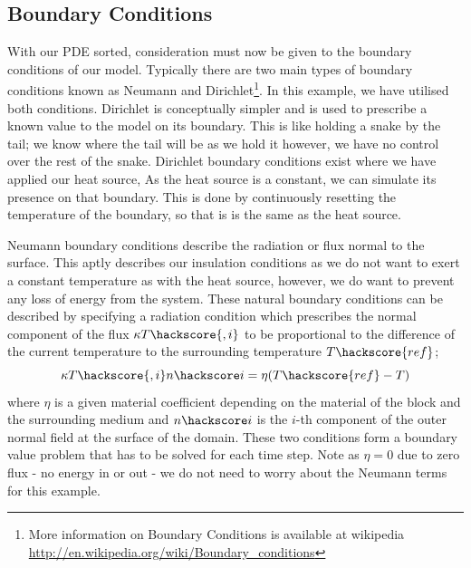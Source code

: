 \subsection{Boundary Conditions}
With our PDE sorted, consideration must now be given to the boundary conditions of our model. Typically there are two main types of boundary conditions known as Neumann and Dirichlet\footnote{More information on Boundary Conditions is available at wikipedia \url{http://en.wikipedia.org/wiki/Boundary_conditions}}. In this example, we have utilised both conditions. Dirichlet is conceptually simpler and is used to prescribe a known value to the model on its boundary. This is like holding a snake by the tail; we know where the tail will be as we hold it however, we have no control over the rest of the snake. Dirichlet boundary conditions exist where we have applied our heat source, As the heat source is a constant, we can simulate its presence on that boundary. This is done by continuously resetting the temperature of the boundary, so that is is the same as the heat source.  

Neumann boundary conditions describe the radiation or flux normal to the surface. This aptly describes our insulation conditions as we do not want to exert a constant temperature as with the heat source, however, we do want to prevent any loss of energy from the system. These natural boundary conditions can be described by specifying a radiation condition which prescribes the normal component of the flux $\kappa T\hackscore{,i}$ to be proportional
to the difference of the current temperature to the surrounding temperature $T\hackscore{ref}$;
\begin{equation}
 \kappa T\hackscore{,i} n\hackscore i = \eta (T\hackscore{ref}-T) 
\label{eqn:hdbc}
\end{equation}
where $\eta$ is a given material coefficient depending on the material of the block and the surrounding medium and $n\hackscore i$ is the $i$-th component of the outer normal field  at the surface of the domain. These two conditions form a boundary value problem that has to be solved for each time step. Note as $\eta = 0$ due to zero flux - no energy in or out - we do not need to worry about the Neumann terms for this example.

